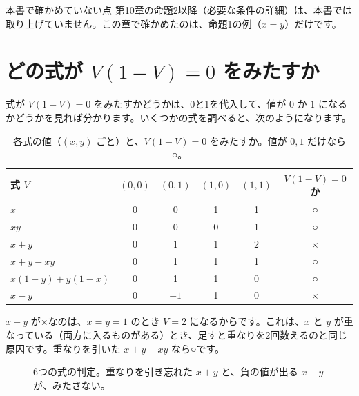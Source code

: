 \documentclass[a4paper,11pt,openany]{ltjsbook}
\begin{document}
\begin{notebox}{本書で確かめていない点}
第10章の命題2以降（必要な条件の詳細）は、本書では取り上げていません。この章で確かめたのは、命題1の例（$x=y$）だけです。
\end{notebox}

\section{どの式が $V(1-V)=0$ をみたすか}

式が $V(1-V)=0$ をみたすかどうかは、0と1を代入して、値が $0$ か $1$ になるかどうかを見れば分かります。いくつかの式を調べると、次のようになります。

\begin{table}[htbp]
\centering
\begin{tabular}{l|cccc|c}
\toprule
式 $V$ & $(0,0)$ & $(0,1)$ & $(1,0)$ & $(1,1)$ & $V(1-V)=0$ か\\
\midrule
$x$ & 0 & 0 & 1 & 1 & ○\\
$xy$ & 0 & 0 & 0 & 1 & ○\\
$x+y$ & 0 & 1 & 1 & 2 & ×\\
$x+y-xy$ & 0 & 1 & 1 & 1 & ○\\
$x(1-y)+y(1-x)$ & 0 & 1 & 1 & 0 & ○\\
$x-y$ & 0 & $-1$ & 1 & 0 & ×\\
\bottomrule
\end{tabular}
\caption{各式の値（$(x,y)$ ごと）と、$V(1-V)=0$ をみたすか。値が $0,1$ だけなら○。}
\end{table}

$x+y$ が×なのは、$x=y=1$ のとき $V=2$ になるからです。これは、$x$ と $y$ が重なっている（両方に入るものがある）とき、足すと重なりを2回数えるのと同じ原因です。重なりを引いた $x+y-xy$ なら○です。

\begin{figure}[htbp]
\centering
{}
\caption{6つの式の判定。重なりを引き忘れた $x+y$ と、負の値が出る $x-y$ が、みたさない。}
\end{figure}
\end{document}
